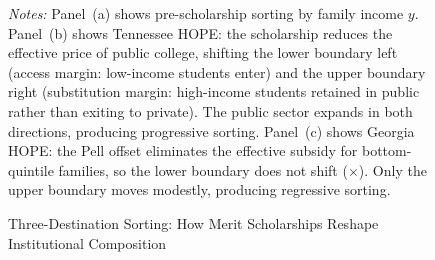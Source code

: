 \begin{figure}[t]

\caption{Three-Destination Sorting: How Merit Scholarships Reshape
  Institutional Composition}
\label{fig:sorting_model}

\vspace{1mm}
\begin{minipage}{0.92\textwidth}
  \footnotesize
  \textit{Notes:} Panel~(a) shows pre-scholarship sorting by family
  income $y$. Panel~(b) shows Tennessee HOPE: the scholarship reduces
  the effective price of public college, shifting the lower boundary
  left (access margin: low-income students enter) and the upper boundary
  right (substitution margin: high-income students retained in public
  rather than exiting to private). The public sector expands in both
  directions, producing progressive sorting. Panel~(c) shows Georgia
  HOPE: the Pell offset eliminates the effective subsidy for
  bottom-quintile families, so the lower boundary does not shift
  ($\times$). Only the upper boundary moves modestly, producing
  regressive sorting.
\end{minipage}
\end{figure}
